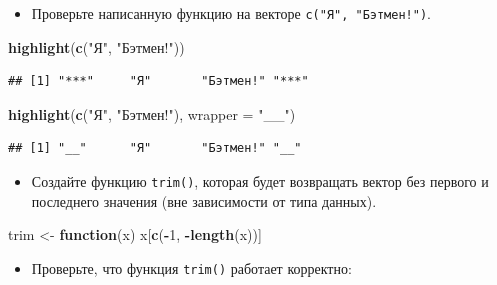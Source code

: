 \documentclass[]{book}
\newenvironment{Shaded}{\begin{snugshade}}{\end{snugshade}}
\newcommand{\KeywordTok}[1]{\textcolor[rgb]{0.13,0.29,0.53}{\textbf{#1}}}
\newcommand{\DataTypeTok}[1]{\textcolor[rgb]{0.13,0.29,0.53}{#1}}
\newcommand{\DecValTok}[1]{\textcolor[rgb]{0.00,0.00,0.81}{#1}}
\newcommand{\StringTok}[1]{\textcolor[rgb]{0.31,0.60,0.02}{#1}}
\newcommand{\ControlFlowTok}[1]{\textcolor[rgb]{0.13,0.29,0.53}{\textbf{#1}}}
\newcommand{\OperatorTok}[1]{\textcolor[rgb]{0.81,0.36,0.00}{\textbf{#1}}}
\newcommand{\NormalTok}[1]{#1}
\providecommand{\tightlist}{%
  \setlength{\itemsep}{0pt}\setlength{\parskip}{0pt}}
\begin{document}
\begin{itemize}
\tightlist
\item
  Проверьте написанную функцию на векторе \texttt{c("Я",\ "Бэтмен!")}.
\end{itemize}

\begin{Shaded}
\begin{Highlighting}[]
\KeywordTok{highlight}\NormalTok{(}\KeywordTok{c}\NormalTok{(}\StringTok{"Я"}\NormalTok{, }\StringTok{"Бэтмен!"}\NormalTok{)) }
\end{Highlighting}
\end{Shaded}

\begin{verbatim}
## [1] "***"     "Я"       "Бэтмен!" "***"
\end{verbatim}

\begin{Shaded}
\begin{Highlighting}[]
\KeywordTok{highlight}\NormalTok{(}\KeywordTok{c}\NormalTok{(}\StringTok{"Я"}\NormalTok{, }\StringTok{"Бэтмен!"}\NormalTok{), }\DataTypeTok{wrapper =} \StringTok{"__"}\NormalTok{) }
\end{Highlighting}
\end{Shaded}

\begin{verbatim}
## [1] "__"      "Я"       "Бэтмен!" "__"
\end{verbatim}

\begin{itemize}
\tightlist
\item
  Создайте функцию \texttt{trim()}, которая будет возвращать вектор без
  первого и последнего значения (вне зависимости от типа данных).
\end{itemize}

\begin{Shaded}
\begin{Highlighting}[]
\NormalTok{trim <-}\StringTok{ }\ControlFlowTok{function}\NormalTok{(x) x[}\KeywordTok{c}\NormalTok{(}\OperatorTok{-}\DecValTok{1}\NormalTok{, }\OperatorTok{-}\KeywordTok{length}\NormalTok{(x))]}
\end{Highlighting}
\end{Shaded}

\begin{itemize}
\tightlist
\item
  Проверьте, что функция \texttt{trim()} работает корректно:
\end{itemize}
\end{document}
